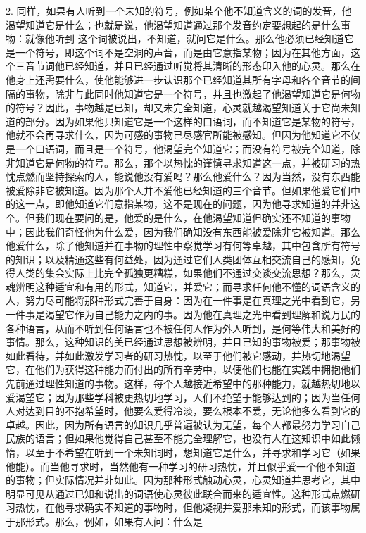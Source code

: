 2. 同样，如果有人听到一个未知的符号，例如某个他不知道含义的词的发音，他渴望知道它是什么；也就是说，他渴望知道通过那个发音约定要想起的是什么事物：就像他听到  这个词被说出，不知道，就问它是什么。那么他必须已经知道它是一个符号，即这个词不是空洞的声音，而是由它意指某物；因为在其他方面，这个三音节词他已经知道，并且已经通过听觉将其清晰的形态印入他的心灵。那么在他身上还需要什么，使他能够进一步认识那个已经知道其所有字母和各个音节的间隔的事物，除非与此同时他知道它是一个符号，并且也激起了他渴望知道它是何物的符号？因此，事物越是已知，却又未完全知道，心灵就越渴望知道关于它尚未知道的部分。因为如果他只知道它是一个这样的口语词，而不知道它是某物的符号，他就不会再寻求什么，因为可感的事物已尽感官所能被感知。但因为他知道它不仅是一个口语词，而且是一个符号，他渴望完全知道它；而没有符号被完全知道，除非知道它是何物的符号。那么，那个以热忱的谨慎寻求知道这一点，并被研习的热忱点燃而坚持探索的人，能说他没有爱吗？那么他爱什么？因为当然，没有东西能被爱除非它被知道。因为那个人并不爱他已经知道的三个音节。但如果他爱它们中的这一点，即他知道它们意指某物，这不是现在的问题，因为他寻求知道的并非这个。但我们现在要问的是，他爱的是什么，在他渴望知道但确实还不知道的事物中；因此我们奇怪他为什么爱，因为我们确知没有东西能被爱除非它被知道。那么他爱什么，除了他知道并在事物的理性中察觉学习有何等卓越，其中包含所有符号的知识；以及精通这些有何益处，因为通过它们人类团体互相交流自己的感知，免得人类的集会实际上比完全孤独更糟糕，如果他们不通过交谈交流思想？那么，灵魂辨明这种适宜和有用的形式，知道它，并爱它；而寻求任何他不懂的词语含义的人，努力尽可能将那种形式完善于自身：因为在一件事是在真理之光中看到它，另一件事是渴望它作为自己能力之内的事。因为他在真理之光中看到理解和说万民的各种语言，从而不听到任何语言也不被任何人作为外人听到，是何等伟大和美好的事情。那么，这种知识的美已经通过思想被辨明，并且已知的事物被爱；那事物被如此看待，并如此激发学习者的研习热忱，以至于他们被它感动，并热切地渴望它，在他们为获得这种能力而付出的所有辛劳中，以便他们也能在实践中拥抱他们先前通过理性知道的事物。这样，每个人越接近希望中的那种能力，就越热切地以爱渴望它；因为那些学科被更热切地学习，人们不绝望于能够达到的；因为当任何人对达到目的不抱希望时，他要么爱得冷淡，要么根本不爱，无论他多么看到它的卓越。因此，因为所有语言的知识几乎普遍被认为无望，每个人都最努力学习自己民族的语言；但如果他觉得自己甚至不能完全理解它，也没有人在这知识中如此懒惰，以至于不希望在听到一个未知词时，想知道它是什么，并寻求和学习它（如果他能）。而当他寻求时，当然他有一种学习的研习热忱，并且似乎爱一个他不知道的事物；但实际情况并非如此。因为那种形式触动心灵，心灵知道并思考它，其中明显可见从通过已知和说出的词语使心灵彼此联合而来的适宜性。这种形式点燃研习热忱，在他寻求确实不知道的事物时，但他凝视并爱那未知的形式，而该事物属于那形式。那么，例如，如果有人问：什么是 
